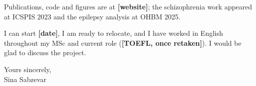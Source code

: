 \documentclass[11pt,a4paper]{article}
\newif\ifdraft
\newcommand{\fillme}[1]{\ifdraft{\color{todo}\bfseries[FILL: #1]}\else\textbf{[#1]}\fi}
\begin{document}
Publications, code and figures are at \fillme{website}; the schizophrenia work appeared at
ICSPIS 2023 and the epilepsy analysis at OHBM 2025.

I can start \fillme{date}, I am ready to relocate, and I have worked in English throughout my
MSc and current role (\fillme{TOEFL, once retaken}). I would be glad to discuss the project.

\vspace{12pt}
Yours sincerely,\\[14pt]
Sina Sabzevar
\end{document}
